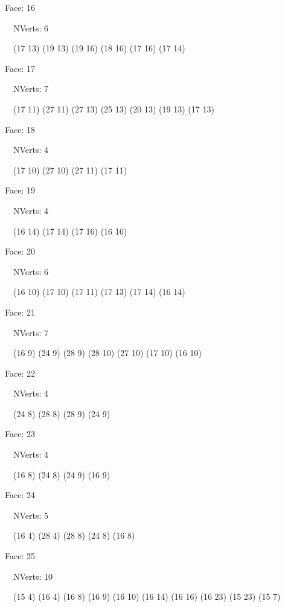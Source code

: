 \documentclass{article}
\begin{document}
{\footnotesize 

Face: 16

\   \    NVerts: 6

 \   \   (17 13) (19 13) (19 16) (18 16) (17 16) (17 14)}

{\footnotesize 

Face: 17

\   \    NVerts: 7

 \   \   (17 11) (27 11) (27 13) (25 13) (20 13) (19 13) (17 13)}

{\footnotesize 

Face: 18

\   \    NVerts: 4

 \   \   (17 10) (27 10) (27 11) (17 11)}

{\footnotesize 

Face: 19

\   \    NVerts: 4

 \   \   (16 14) (17 14) (17 16) (16 16)}

{\footnotesize 

Face: 20

\   \    NVerts: 6

 \   \   (16 10) (17 10) (17 11) (17 13) (17 14) (16 14)}

{\footnotesize 

Face: 21

\   \    NVerts: 7

 \   \   (16 9) (24 9) (28 9) (28 10) (27 10) (17 10) (16 10)}

{\footnotesize 

Face: 22

\   \    NVerts: 4

 \   \   (24 8) (28 8) (28 9) (24 9)}

{\footnotesize 

Face: 23

\   \    NVerts: 4

 \   \   (16 8) (24 8) (24 9) (16 9)}

{\footnotesize 

Face: 24

\   \    NVerts: 5

 \   \   (16 4) (28 4) (28 8) (24 8) (16 8)}

{\footnotesize 

Face: 25

\   \    NVerts: 10

 \   \   (15 4) (16 4) (16 8) (16 9) (16 10) (16 14) (16 16) (16 23) (15 23) (15 7)}
\end{document}
